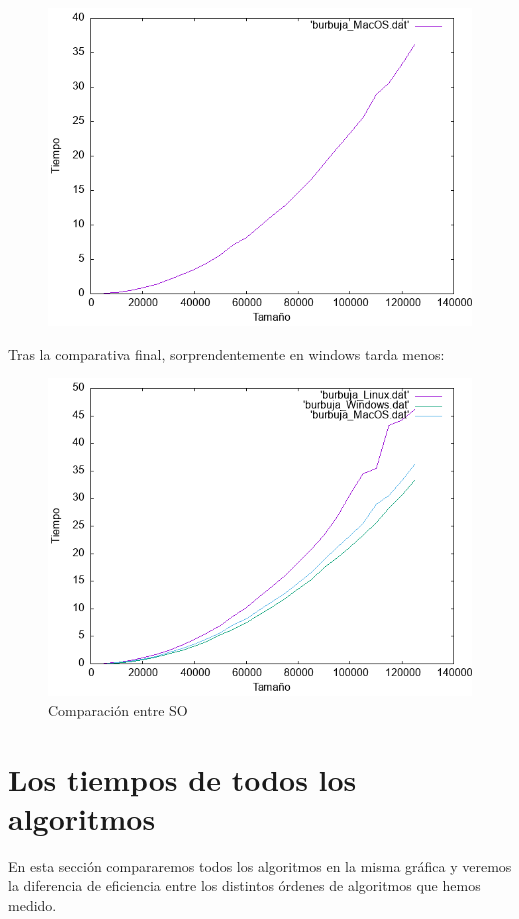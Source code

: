\documentclass[12pt, spanish]{article}
\begin{document}
\begin{figure}[H]
  \centering
  \includegraphics[scale = 0.7]{burbujaMacOS.png}
\end{figure}

Tras la comparativa final, sorprendentemente en windows tarda menos:
\begin{figure}[H]
  \centering
  \includegraphics[scale = 0.8]{burbujaOS.png}
  \caption{Comparación entre SO}
\end{figure}

\section{Los tiempos de todos los algoritmos}
En esta sección compararemos todos los algoritmos en la misma gráfica y veremos la diferencia de eficiencia entre los distintos órdenes de algoritmos que hemos medido.
\end{document}
